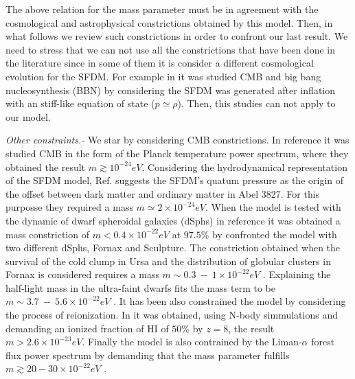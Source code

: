 \documentclass[amssymb,twocolumn,prd,nofootinbib,showpacs]{revtex4-1}
\begin{document}
The above relation for the mass parameter must be in agreement with the cosmological and astrophysical constrictions  obtained by this model. Then, in what follows we review such constrictions in order to confront our last result. We need to stress that we can not use all the constrictions that have been done in the literature since in some of them it is consider a different cosmological evolution for the SFDM. For example in \cite{SFphi41} it was studied CMB and big bang nucleosynthesis (BBN) by considering the SFDM was generated after inflation with an stiff-like equation of state ($p\simeq \rho$). Then, this studies can not apply to our model.    

\textit{Other constraints.-} We star by considering CMB constrictions. In reference \cite{constn1} it was studied CMB in the form of the Planck temperature power spectrum, where they obtained the result $m\gtrsim 10^{-24}eV$. Considering the hydrodynamical representation of the SFDM model, Ref. \cite{constn2} suggests the SFDM's quatum pressure as the origin of the offset between dark matter and ordinary matter in Abel 3827. For this purposse they required a mass  $m\simeq 2\times 10^{-24}eV$. When the model is tested with the dynamic of dwarf spheroidal galaxies (dSphs) in reference \cite{constn3} it was obtained a mass constriction of $m<0.4\times 10^{-22}eV$ at $97.5\%$ by confronted the model with two different dSphs, Fornax and Sculpture. The constriction obtained when the survival of the cold clump in Ursa and the distribution of globular clusters in Fornax is considered requires a mass $m\sim 0.3\ - \ 1\times 10^{-22}eV$ \cite{constn4}. Explaining the half-light mass in the ultra-faint dwarfs fits the mass term to be $m\sim 3.7 \ - \ 5.6\times 10^{-22}eV$ \cite{constn5}. It has been also constrained the model by considering the process of reionization. In \cite{constn6} it was obtained, using N-body simmulations and demanding an ionized fraction of HI of $50\%$ by $z=8$, the result $m>2.6\times 10^{-23}eV$. Finally the model is also contrained by the Liman-$\alpha$ forest flux power spectrum by demanding that the mass parameter fulfills $m\gtrsim 20-30\times 10^{-22}eV$ \cite{constn7,constn8}.
\end{document}
